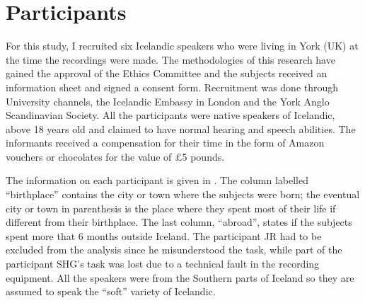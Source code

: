 \documentclass[11pt,a4paper,openany]{memoir}\usepackage[]{graphicx}\usepackage[]{color}
\begin{document}
\section{Participants}
\label{s:participants}

For this study, I recruited six Icelandic speakers who were living in York (UK) at the time the recordings were made.
The methodologies of this research have gained the approval of the Ethics Committee and the subjects received an information sheet and signed a consent form.
Recruitment was done through University channels, the Icelandic Embassy in London and the York Anglo Scandinavian Society.
All the participants were native speakers of Icelandic, above 18 years old and claimed to have normal hearing and speech abilities.
The informants received a compensation for their time in the form of Amazon vouchers or chocolates for the value of £5 pounds.

The information on each participant is given in .
The column labelled ``birthplace'' contains the city or town where the subjects were born; the eventual city or town in parenthesis is the place where they spent most of their life if different from their birthplace.
The last column, ``abroad'', states if the subjects spent more that 6 months outside Iceland.
The participant JR had to be excluded from the analysis since he misunderstood the task, while part of the participant SHG's task was lost due to a technical fault in the recording equipment.
All the speakers were from the Southern parts of Iceland so they are assumed to speak the ``soft'' variety of Icelandic.


\end{document}
